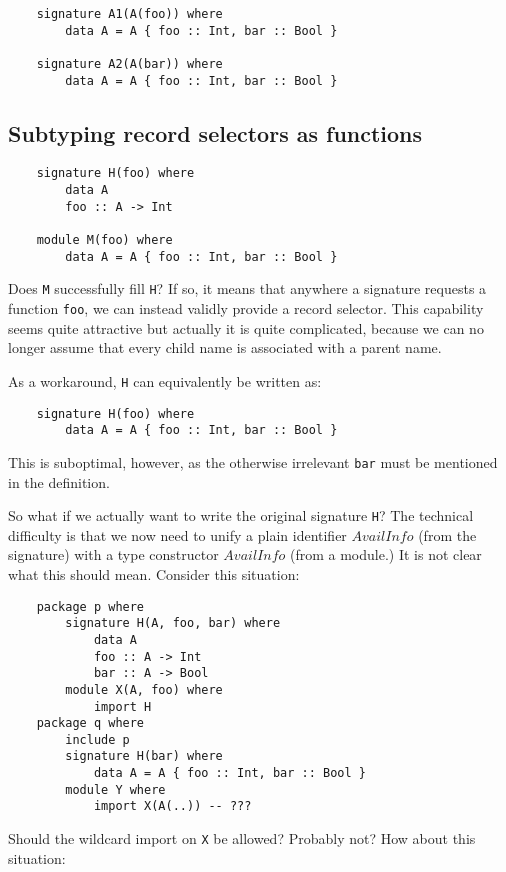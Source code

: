 \documentclass{article}
\begin{document}
\begin{verbatim}
    signature A1(A(foo)) where
        data A = A { foo :: Int, bar :: Bool }

    signature A2(A(bar)) where
        data A = A { foo :: Int, bar :: Bool }
\end{verbatim}

\subsection{Subtyping record selectors as functions}

\begin{verbatim}
    signature H(foo) where
        data A
        foo :: A -> Int

    module M(foo) where
        data A = A { foo :: Int, bar :: Bool }
\end{verbatim}
%
Does \verb|M| successfully fill \verb|H|?  If so, it means that anywhere
a signature requests a function \verb|foo|, we can instead validly
provide a record selector.  This capability seems quite attractive
but actually it is quite complicated, because we can no longer assume
that every child name is associated with a parent name.

As a workaround, \verb|H| can equivalently be written as:

\begin{verbatim}
    signature H(foo) where
        data A = A { foo :: Int, bar :: Bool }
\end{verbatim}
%
This is suboptimal, however, as the otherwise irrelevant \verb|bar| must be mentioned
in the definition.

So what if we actually want to write the original signature \verb|H|?
The technical difficulty is that we now need to unify a plain identifier
$AvailInfo$ (from the signature) with a type constructor $AvailInfo$
(from a module.)  It is not clear what this should mean.
Consider this situation:

\begin{verbatim}
    package p where
        signature H(A, foo, bar) where
            data A
            foo :: A -> Int
            bar :: A -> Bool
        module X(A, foo) where
            import H
    package q where
        include p
        signature H(bar) where
            data A = A { foo :: Int, bar :: Bool }
        module Y where
            import X(A(..)) -- ???
\end{verbatim}

Should the wildcard import on \verb|X| be allowed?  Probably not?
How about this situation:
\end{document}
